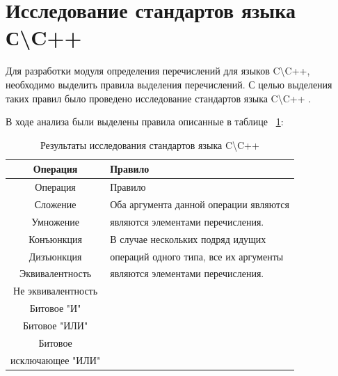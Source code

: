 \documentclass[a4paper,english,russian]{G2-105}
\begin{document}
\section{Исследование стандартов языка С\textbackslash C++}
\par Для разработки модуля определения перечислений для языков C\textbackslash C++, необходимо выделить правила выделения перечислений. С целью выделения таких правил было проведено исследование стандартов языка C\textbackslash C++ \cite{8,9}. 
\par В ходе анализа были выделены правила описанные в таблице ~\ref{rules}:
\begin{longtable}{|c|l|}
    \caption{Результаты исследования стандартов языка C\textbackslash C++}  \label{rules} \\ \hline
    Операция & Правило \\ \hline 
    \endfirsthead
    \hline
    Операция & Правило \\ \hline 
    \endhead
    Сложение          & Оба аргумента данной операции являются \\ \cline{1-1}
    Умножение         & являются элементами перечисления. \\ \cline{1-1}
    Конъюнкция        & В случае нескольких подряд идущих \\ \cline{1-1}
    Дизъюнкция        & операций одного типа, все их  аргументы\\ \cline{1-1}
    Эквивалентность   & являются элементами перечисления.\\ \cline{1-1}
    Не эквивалентность& \\  \cline{1-1} 
    Битовое "И"       & \\  \cline{1-1}
    Битовое "ИЛИ"     & \\  \cline{1-1}
    Битовое           & \\
    исключающее "ИЛИ" & \\ \hline


\end{longtable}
\end{document}
